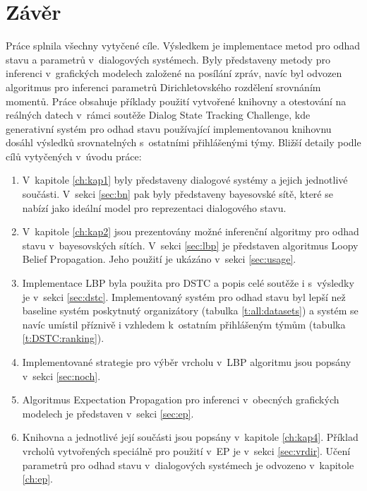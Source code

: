 \chapter*{Závěr}

Práce splnila všechny vytyčené cíle.
Výsledkem je implementace metod pro odhad stavu a parametrů v~dialogových systémech.
Byly představeny metody pro inferenci v~grafických modelech založené na posílání zpráv, navíc byl odvozen algoritmus pro inferenci parametrů Dirichletovského rozdělení srovnáním momentů.
Práce obsahuje příklady použití vytvořené knihovny a otestování na reálných datech v~rámci soutěže Dialog State Tracking Challenge, kde generativní systém pro odhad stavu používající implementovanou knihovnu dosáhl výsledků srovnatelných s~ostatními přihlášenými týmy.
Bližší detaily podle cílů vytyčených v~úvodu práce:
\begin{enumerate}

\item V~kapitole \ref{ch:kap1} byly představeny dialogové systémy a jejich jednotlivé součásti.
V~sekci \ref{sec:bn} pak byly představeny bayesovské sítě, které se nabízí jako ideální model pro reprezentaci dialogového stavu.

\item V~kapitole \ref{ch:kap2} jsou prezentovány možné inferenční algoritmy pro odhad stavu v~bayesovských sítích.
V~sekci \ref{sec:lbp} je představen algoritmus Loopy Belief Propagation.
Jeho použití je ukázáno v~sekci \ref{sec:usage}.

\item Implementace LBP byla použita pro DSTC a popis celé soutěže i s~výsledky je v~sekci \ref{sec:dstc}.
Implementovaný systém pro odhad stavu byl lepší než baseline systém poskytnutý organizátory (tabulka \ref{t:all:datasets}) a systém se navíc umístil příznivě i vzhledem k~ostatním přihlášeným týmům (tabulka \ref{t:DSTC:ranking}).

\item Implementované strategie pro výběr vrcholu v~LBP algoritmu jsou popsány v~sekci \ref{sec:noch}.

\item Algoritmus Expectation Propagation pro inferenci v~obecných grafických modelech je představen v~sekci \ref{sec:ep}.

\item Knihovna a jednotlivé její součásti jsou popsány v~kapitole \ref{ch:kap4}.
Příklad vrcholů vytvořených speciálně pro použití v~EP je v~sekci \ref{sec:vrdir}.
Učení parametrů pro odhad stavu v~dialogových systémech je odvozeno v~kapitole \ref{ch:ep}.
\end{enumerate}
